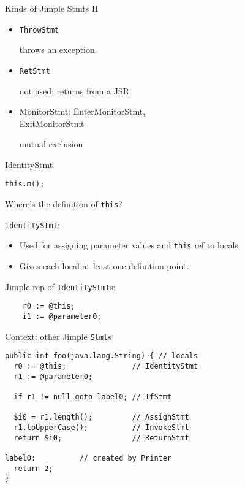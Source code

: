 \begin{slide}{Kinds of Jimple Stmts II}
\begin{itemize}
\item {\tt ThrowStmt}

\qquad throws an exception

\item {\tt RetStmt}

\qquad not used; returns from a JSR

\item {\tt \begin{tabbing}
MonitorStmt: \= EnterMonitorStmt, \\
                  \> ExitMonitorStmt
\end{tabbing}}

\qquad mutual exclusion
\end{itemize}
\end{slide}

\begin{slide}{IdentityStmt}
\begin{center}
{\tt this.m(); }
\end{center}

Where's the definition of {\tt this}?

\quad
\vspace*{-0.08in}

{\tt IdentityStmt}:
\begin{itemize}
\item Used for assigning parameter values and {\tt this} ref to locals.

\item Gives each local at least one definition point.
\end{itemize}

\vspace*{0.03in}
Jimple rep of {\tt IdentityStmt}s:
\begin{verbatim}
    r0 := @this;
    i1 := @parameter0;
\end{verbatim}
\end{slide}

\begin{slide}{Context: other Jimple {\tt Stmt}s}
\vspace*{-0.15in}
{\small
\begin{verbatim}
public int foo(java.lang.String) { // locals
  r0 := @this;               // IdentityStmt
  r1 := @parameter0;

  if r1 != null goto label0; // IfStmt

  $i0 = r1.length();         // AssignStmt
  r1.toUpperCase();          // InvokeStmt
  return $i0;                // ReturnStmt

label0:          // created by Printer
  return 2;
}
\end{verbatim}}
\end{slide}

